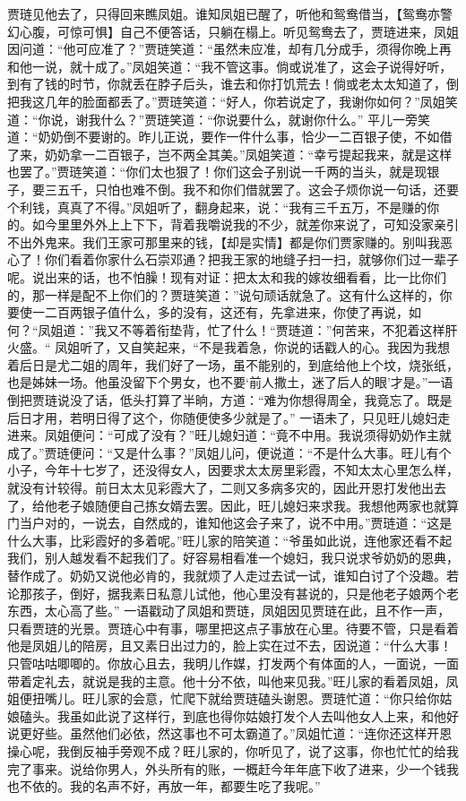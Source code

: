 \documentclass[12pt,oneside]{book}
\begin{document}
贾琏见他去了，只得回来瞧凤姐。谁知凤姐已醒了，听他和鸳鸯借当，【鸳鸯亦警幻心腹，可惊可惧】自己不便答话，只躺在榻上。听见鸳鸯去了，贾琏进来，凤姐因问道：“他可应准了？”贾琏笑道：“虽然未应准，却有几分成手，须得你晚上再和他一说，就十成了。”凤姐笑道：“我不管这事。倘或说准了，这会子说得好听，到有了钱的时节，你就丢在脖子后头，谁去和你打饥荒去！倘或老太太知道了，倒把我这几年的脸面都丢了。”贾琏笑道：“好人，你若说定了，我谢你如何？”凤姐笑道：“你说，谢我什么？”贾琏笑道：“你说要什么，就谢你什么。”
平儿一旁笑道：“奶奶倒不要谢的。昨儿正说，要作一件什么事，恰少一二百银子使，不如借了来，奶奶拿一二百银子，岂不两全其美。”凤姐笑道：“幸亏提起我来，就是这样也罢了。”贾琏笑道：“你们太也狠了！你们这会子别说一千两的当头，就是现银子，要三五千，只怕也难不倒。我不和你们借就罢了。这会子烦你说一句话，还要个利钱，真真了不得。”凤姐听了，翻身起来，说：“我有三千五万，不是赚的你的。如今里里外外上上下下，背着我嚼说我的不少，就差你来说了，可知没家亲引不出外鬼来。我们王家可那里来的钱，【却是实情】都是你们贾家赚的。别叫我恶心了！你们看着你家什么石崇邓通？把我王家的地缝子扫一扫，就够你们过一辈子呢。说出来的话，也不怕臊！现有对证：把太太和我的嫁妆细看看，比一比你们的，那一样是配不上你们的？贾琏笑道：”说句顽话就急了。这有什么这样的，你要使一二百两银子值什么，多的没有，这还有，先拿进来，你使了再说，如何？“凤姐道：”我又不等着衔垫背，忙了什么！“贾琏道：”何苦来，不犯着这样肝火盛。“
凤姐听了，又自笑起来，“不是我着急，你说的话戳人的心。我因为我想着后日是尤二姐的周年，我们好了一场，虽不能别的，到底给他上个坟，烧张纸，也是姊妹一场。他虽没留下个男女，也不要‘前人撒土，迷了后人的眼’才是。”一语倒把贾琏说没了话，低头打算了半晌，方道：“难为你想得周全，我竟忘了。既是后日才用，若明日得了这个，你随便使多少就是了。”
一语未了，只见旺儿媳妇走进来。凤姐便问：“可成了没有？”旺儿媳妇道：“竟不中用。我说须得奶奶作主就成了。”贾琏便问：“又是什么事？”凤姐儿问，便说道：“不是什么大事。旺儿有个小子，今年十七岁了，还没得女人，因要求太太房里彩霞，不知太太心里怎么样，就没有计较得。前日太太见彩霞大了，二则又多病多灾的，因此开恩打发他出去了，给他老子娘随便自己拣女婿去罢。因此，旺儿媳妇来求我。我想他两家也就算门当户对的，一说去，自然成的，谁知他这会子来了，说不中用。”贾琏道：“这是什么大事，比彩霞好的多着呢。”旺儿家的陪笑道：“爷虽如此说，连他家还看不起我们，别人越发看不起我们了。好容易相看准一个媳妇，我只说求爷奶奶的恩典，替作成了。奶奶又说他必肯的，我就烦了人走过去试一试，谁知白讨了个没趣。若论那孩子，倒好，据我素日私意儿试他，他心里没有甚说的，只是他老子娘两个老东西，太心高了些。”
一语戳动了凤姐和贾琏，凤姐因见贾琏在此，且不作一声，只看贾琏的光景。贾琏心中有事，哪里把这点子事放在心里。待要不管，只是看着他是凤姐儿的陪房，且又素日出过力的，脸上实在过不去，因说道：“什么大事！只管咕咕唧唧的。你放心且去，我明儿作媒，打发两个有体面的人，一面说，一面带着定礼去，就说是我的主意。他十分不依，叫他来见我。”旺儿家的看着凤姐，凤姐便扭嘴儿。旺儿家的会意，忙爬下就给贾琏磕头谢恩。贾琏忙道：“你只给你姑娘磕头。我虽如此说了这样行，到底也得你姑娘打发个人去叫他女人上来，和他好说更好些。虽然他们必依，然这事也不可太霸道了。”凤姐忙道：“连你还这样开恩操心呢，我倒反袖手旁观不成？旺儿家的，你听见了，说了这事，你也忙忙的给我完了事来。说给你男人，外头所有的账，一概赶今年年底下收了进来，少一个钱我也不依的。我的名声不好，再放一年，都要生吃了我呢。”
\end{document}
